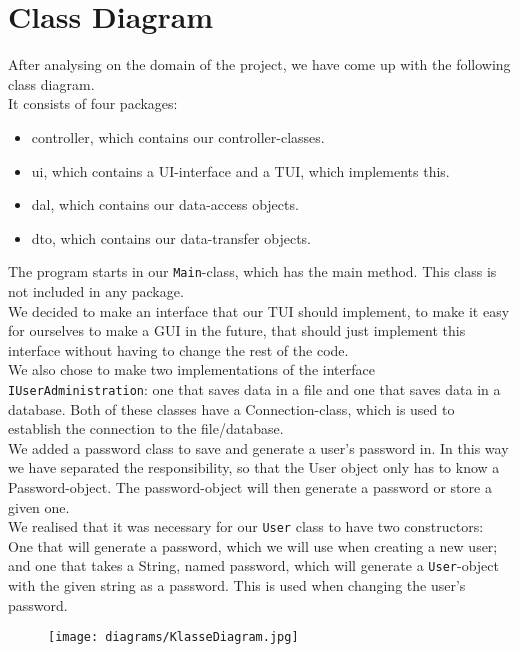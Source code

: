 \section{Class Diagram}

After analysing on the domain of the project, we have come up with the following class diagram.\\
It consists of four packages:
\begin{itemize}
    \item controller, which contains our controller-classes.
    \item ui, which contains a UI-interface and a TUI, which implements this.
    \item dal, which contains our data-access objects.
    \item dto, which contains our data-transfer objects.
\end{itemize}

\noindent The program starts in our \texttt{Main}-class, which has the main method. This class is not included in any package.\\
We decided to make an interface that our TUI should implement, to make it easy for ourselves to make a GUI in the future, that should just implement this interface without having to change the rest of the code.\\
We also chose to make two implementations of the interface \texttt{IUserAdministration}: one that saves data in a file and one that saves data in a database. Both of these classes have a Connection-class, which is used to establish the connection to the file/database.\\
We added a password class to save and generate a user's password in. In this way we have separated the responsibility, so that the User object only has to know a Password-object. The password-object will then generate a password or store a given one.\\
We realised that it was necessary for our \texttt{User} class to have two constructors: One that will generate a password, which we will use when creating a new user; and one that takes a String, named password, which will generate a \texttt{User}-object with the given string as a password. This is used when changing the user's password. 

\begin{figure}
    \centering
    \texttt{[image: diagrams/KlasseDiagram.jpg]}
\end{figure}
\restoregeometry